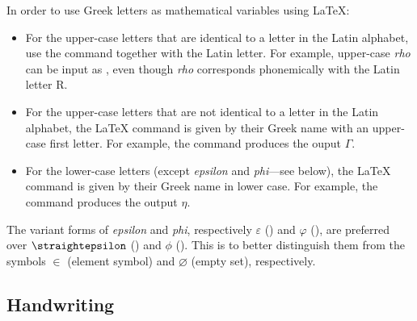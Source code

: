 \begin{latextip}
In order to use Greek letters as mathematical variables using \LaTeX{}:
\begin{itemize}
\item For the upper-case letters that are identical to a letter in the Latin alphabet, use the  command together with the Latin letter. For example, upper-case \textit{rho} can be input as , even though \textit{rho} corresponds phonemically with the Latin letter R.
\item For the upper-case letters that are not identical to a letter in the Latin alphabet, the \LaTeX{} command is given by their Greek name with an upper-case first letter. For example, the command  produces the ouput $\Gamma$.
\item For the lower-case letters (except \textit{epsilon} and \textit{phi}---see below), the \LaTeX{} command is given by their Greek name in lower case. For example, the command  produces the output $\eta$.
\end{itemize}
The variant forms of \textit{epsilon} and \textit{phi}, respectively $\varepsilon$ () and $\varphi$ (), are preferred over $\text{\straightepsilon}$ () and $\phi$ (). This is to better distinguish them from the symbols $\in$ (element symbol) and $\varnothing$ (empty set), respectively.
\end{latextip}

\subsection*{Handwriting}

\todo{}